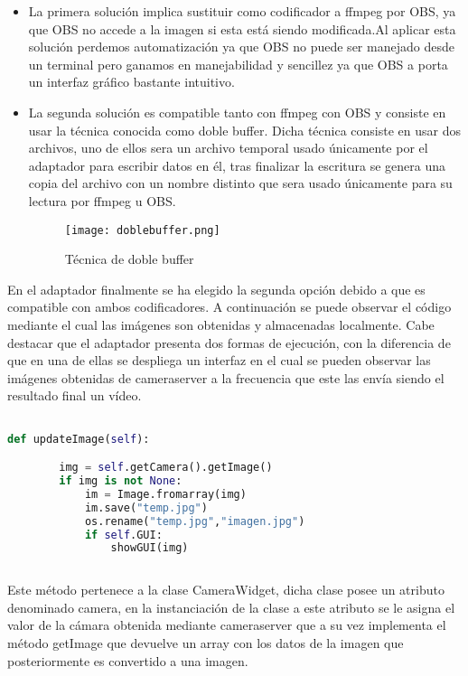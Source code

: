 \begin{itemize}
    \item La primera solución implica sustituir como codificador a ffmpeg por OBS, ya que OBS no accede a la imagen si esta está siendo modificada.Al aplicar esta solución perdemos automatización ya que OBS no puede ser manejado desde un terminal pero ganamos en manejabilidad y sencillez ya que OBS a porta un interfaz gráfico bastante intuitivo.
    \item La segunda solución es compatible tanto con ffmpeg con OBS y consiste en usar la técnica conocida como doble buffer. Dicha técnica consiste en usar dos archivos, uno de ellos sera un archivo temporal usado únicamente por el adaptador para escribir datos en él, tras finalizar la escritura se genera una copia del archivo con un nombre distinto que sera usado únicamente para su lectura por ffmpeg u OBS.
    \\
    
    \begin{figure}[H]
        \centering
        \texttt{[image: doblebuffer.png]}
        \caption{Técnica de doble buffer}
    \end{figure}


\end{itemize}


En el adaptador finalmente se ha elegido la segunda opción debido a que es compatible con ambos codificadores. A continuación se puede observar el código mediante el cual las imágenes son obtenidas y almacenadas localmente. Cabe destacar que el adaptador presenta dos formas de ejecución, con la diferencia de que en una de ellas se despliega un interfaz en el cual se pueden observar las imágenes obtenidas de cameraserver a la frecuencia que este las envía siendo el resultado final un vídeo.
\\
\begin{lstlisting}[language=Python]

def updateImage(self):

        img = self.getCamera().getImage()
        if img is not None:
            im = Image.fromarray(img)
            im.save("temp.jpg")
            os.rename("temp.jpg","imagen.jpg")
            if self.GUI:
                showGUI(img)
                
\end{lstlisting}

Este método pertenece a la clase CameraWidget, dicha clase posee un atributo denominado camera, en la instanciación de la clase a este atributo se le asigna el valor de la cámara obtenida mediante cameraserver que a su vez implementa el método getImage que devuelve un array con los datos de la imagen que posteriormente es convertido a una imagen. 

